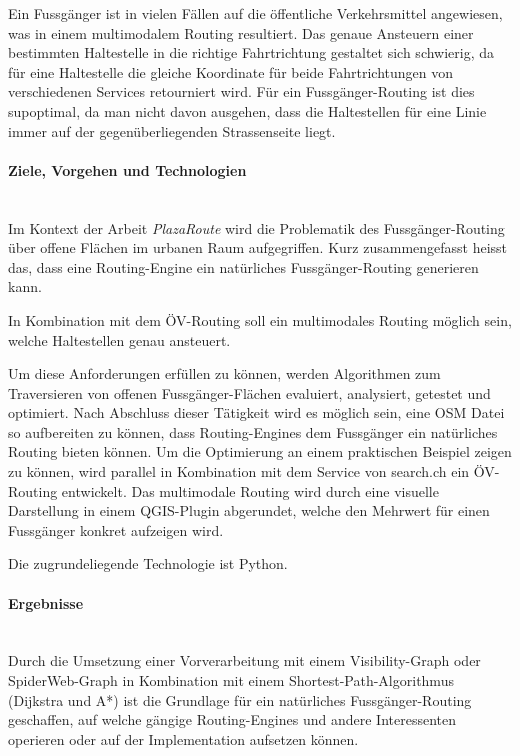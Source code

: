 Ein Fussgänger ist in vielen Fällen auf die öffentliche Verkehrsmittel angewiesen, was in einem multimodalem Routing resultiert. Das genaue Ansteuern einer bestimmten Haltestelle in die richtige Fahrtrichtung gestaltet sich schwierig, da für eine Haltestelle die gleiche Koordinate für beide Fahrtrichtungen von verschiedenen Services retourniert wird. Für ein Fussgänger-Routing ist dies supoptimal, da man nicht davon ausgehen, dass die Haltestellen für eine Linie immer auf der gegenüberliegenden Strassenseite liegt.


\paragraph{Ziele, Vorgehen und Technologien}~\\
Im Kontext der Arbeit \emph{PlazaRoute} wird die Problematik des Fussgänger-Routing über offene Flächen im urbanen Raum aufgegriffen. Kurz zusammengefasst heisst das, dass eine Routing-Engine ein natürliches Fussgänger-Routing generieren kann.

In Kombination mit dem ÖV-Routing soll ein multimodales Routing möglich sein, welche Haltestellen genau ansteuert.

Um diese Anforderungen erfüllen zu können, werden Algorithmen zum Traversieren von offenen Fussgänger-Flächen evaluiert, analysiert, getestet und optimiert. Nach Abschluss dieser Tätigkeit wird es möglich sein, eine \ac{OSM} Datei so aufbereiten zu können, dass Routing-Engines dem Fussgänger ein natürliches Routing bieten können. Um die Optimierung an einem praktischen Beispiel zeigen zu können, wird parallel in Kombination mit dem Service von search.ch ein ÖV-Routing entwickelt. Das multimodale Routing wird durch eine visuelle Darstellung in einem QGIS-Plugin abgerundet, welche den Mehrwert für einen Fussgänger konkret aufzeigen wird.

Die zugrundeliegende Technologie ist Python.

\paragraph{Ergebnisse}~\\
Durch die Umsetzung einer Vorverarbeitung mit einem Visibility-Graph oder SpiderWeb-Graph in Kombination mit einem Shortest-Path-Algorithmus (Dijkstra und A*) ist die Grundlage für ein natürliches Fussgänger-Routing geschaffen, auf welche gängige Routing-Engines und andere Interessenten operieren oder auf der Implementation aufsetzen können.

